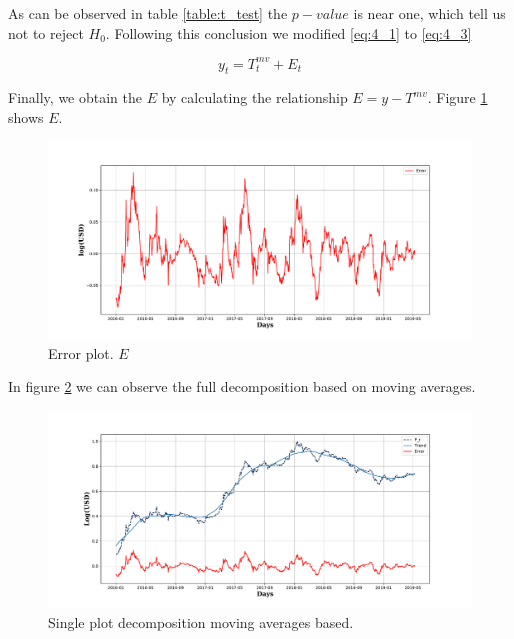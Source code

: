 As can be observed in table \ref{table:t_test} the $p-value$ is near one, which tell us not to reject $H_{0}$. Following this conclusion we modified  \ref{eq:4_1} to \ref{eq:4_3} 

\begin{equation}
y_{t}=T^{mv}_{t}+E_{t}
\label{eq:4_3}
\end{equation}

Finally, we obtain the $E$ by calculating the relationship  $E=y-T^{mv}$. Figure \ref{fig:error} shows $E$. 

\begin{figure}[htpb!] %
	\centering %
	\includegraphics[width=\textwidth]{notebooks/data/Residual_error_u.pdf} %
	\caption{Error plot. $E$} %
	\label{fig:error} %
\end{figure}

In figure \ref{fig:single_plot} we can observe the full decomposition based on moving averages.

\begin{figure}[htpb!] %
	\centering %
	\includegraphics[width=\textwidth]{notebooks/data/single_plot.pdf} %
	\caption{Single plot decomposition moving averages based.} %
	\label{fig:single_plot} %
\end{figure}


